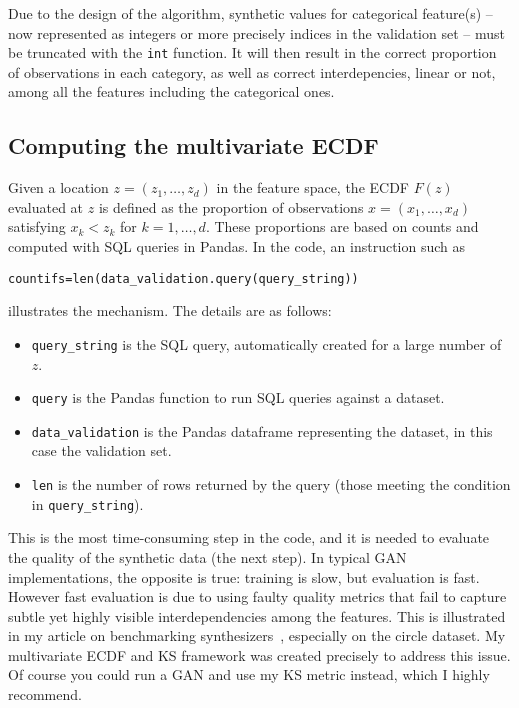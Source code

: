 \documentclass[oneside,10pt]{book}
\begin{document}
Due to the design of the algorithm, synthetic values for categorical feature(s) -- now represented as integers or more precisely indices in the validation set -- must be truncated with the \texttt{int} function. It will then result in the correct proportion of observations in each category, as well as correct interdepencies, linear or not, among all the features including the categorical ones.

\subsection{Computing the multivariate ECDF}\label{iuc3id}

Given a location $z = (z_1,\dots, z_d)$ in the feature space, the ECDF $F(z)$ evaluated at $z$ is defined as
 the proportion of observations $x = (x_1,\dots,x_d)$ satisfying $x_k < z_k$ for $k=1,\dots,d$. These proportions are based on counts
 and computed with SQL queries in Pandas. In the code, an instruction such as
\begin{center}
\texttt{countifs=len(data\_validation.query(query\_string))}
\end{center}
illustrates the mechanism. The details are as follows: \vspace{1ex}
\begin{itemize}
\item \texttt{query\_string} is the SQL query, automatically created for a large number of $z$.
\item \texttt{query} is the Pandas function to run SQL queries against a dataset.
\item \texttt{data\_validation} is the Pandas dataframe representing the dataset, in this case the validation set.
\item \texttt{len} is the number of rows returned by the query (those meeting the condition in \texttt{query\_string}).
\end{itemize}\vspace{1ex}
This is the most time-consuming step in the code, and it is  needed to evaluate the quality of the synthetic data (the next step).
In typical GAN implementations, the opposite is true: training is slow, but evaluation is fast.
However fast evaluation is due to using faulty quality metrics that fail to capture subtle yet highly visible interdependencies among the features.
 This is illustrated in my article on benchmarking synthesizers~\cite{vgvendors}, especially on the circle dataset. My multivariate ECDF and KS framework
 was created precisely to address this issue. Of course you could run a GAN and use my KS metric instead, which I highly recommend.
\end{document}
